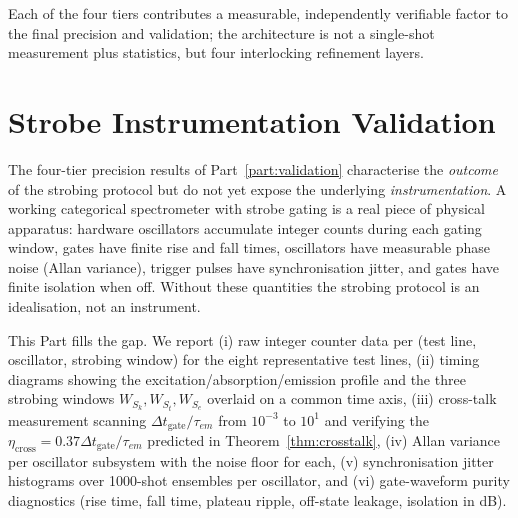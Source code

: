 \documentclass[twocolumn,11pt,a4paper]{article}
\theoremstyle{thmstyle}
\theoremstyle{axiomstyle}
\theoremstyle{definition}
\theoremstyle{remark}
\begin{document}
Each of the four tiers contributes a measurable, independently verifiable factor to the final precision and validation; the architecture is not a single-shot measurement plus statistics, but four interlocking refinement layers.

\part{Strobe Instrumentation Validation}
\label{part:strobeinstr}

The four-tier precision results of Part~\ref{part:validation} characterise the \emph{outcome} of the strobing protocol but do not yet expose the underlying \emph{instrumentation}. A working categorical spectrometer with strobe gating is a real piece of physical apparatus: hardware oscillators accumulate integer counts during each gating window, gates have finite rise and fall times, oscillators have measurable phase noise (Allan variance), trigger pulses have synchronisation jitter, and gates have finite isolation when off. Without these quantities the strobing protocol is an idealisation, not an instrument.

This Part fills the gap. We report (i) raw integer counter data per (test line, oscillator, strobing window) for the eight representative test lines, (ii) timing diagrams showing the excitation/absorption/emission profile and the three strobing windows $W_{S_{k}}, W_{S_{t}}, W_{S_{e}}$ overlaid on a common time axis, (iii) cross-talk measurement scanning $\Delta t_{\text{gate}} / \tau_{em}$ from $10^{-3}$ to $10^{1}$ and verifying the $\eta_{\text{cross}} = 0.37 \Delta t_{\text{gate}}/\tau_{em}$ predicted in Theorem~\ref{thm:crosstalk}, (iv) Allan variance per oscillator subsystem with the noise floor for each, (v) synchronisation jitter histograms over 1000-shot ensembles per oscillator, and (vi) gate-waveform purity diagnostics (rise time, fall time, plateau ripple, off-state leakage, isolation in dB).
\end{document}
